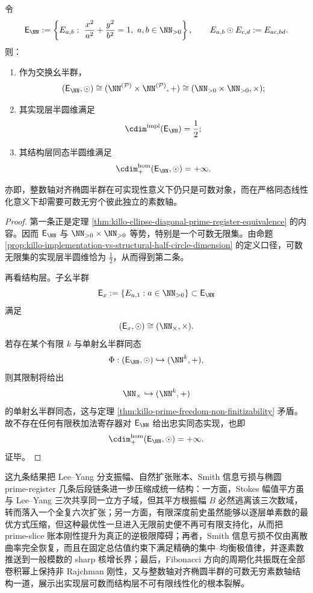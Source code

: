 \begin{theorem}[整数轴对齐椭圆半群在结构层与实现层的半圆维裂解]\label{thm:xi-time-part74-integer-ellipse-structure-implementation-split}
令
\[
\mathsf E_{\NN}
:=
\left\{
E_{a,b}:\ \frac{x^2}{a^2}+\frac{y^2}{b^2}=1,\ a,b\in\NN_{>0}
\right\},
\qquad
E_{a,b}\odot E_{c,d}:=E_{ac,bd}.
\]
则：
\begin{enumerate}
  \item 作为交换幺半群，
  \[
  (\mathsf E_{\NN},\odot)\cong (\NN^{(\mathcal P)}\times \NN^{(\mathcal P)},+)
  \cong (\NN_{>0}\times \NN_{>0},\times);
  \]
  \item 其实现层半圆维满足
  \[
  \cdim^{\mathrm{impl}}(\mathsf E_{\NN})=\frac12;
  \]
  \item 其结构层同态半圆维满足
  \[
  \cdim^{\mathrm{hom}}_{+}(\mathsf E_{\NN},\odot)=+\infty.
  \]
\end{enumerate}
亦即，整数轴对齐椭圆半群在可实现性意义下仍只是可数对象，而在严格同态线性化意义下却需要可数无穷个彼此独立的素数轴。
\end{theorem}
\begin{proof}
第一条正是定理 \ref{thm:killo-ellipse-diagonal-prime-register-equivalence} 的内容。因而 \(\mathsf E_{\NN}\) 与 \(\NN_{>0}\times \NN_{>0}\) 等势，特别是一个可数无限集。由命题 \ref{prop:killo-implementation-vs-structural-half-circle-dimension} 的定义口径，可数无限集的实现层半圆维恰为 \(\frac12\)，从而得到第二条。

再看结构层。子幺半群
\[
\mathsf E_x:=\{E_{a,1}:a\in\NN_{>0}\}\subset \mathsf E_{\NN}
\]
满足
\[
(\mathsf E_x,\odot)\cong (\NN_{\times},\times).
\]
若存在某个有限 \(k\) 与单射幺半群同态
\[
\Phi:(\mathsf E_{\NN},\odot)\hookrightarrow (\NN^k,+),
\]
则其限制将给出
\[
\NN_{\times}\hookrightarrow (\NN^k,+)
\]
的单射幺半群同态，这与定理 \ref{thm:killo-prime-freedom-non-finitizability} 矛盾。故不存在任何有限秩加法寄存器对 \(\mathsf E_{\NN}\) 给出忠实同态实现，也即
\[
\cdim^{\mathrm{hom}}_{+}(\mathsf E_{\NN},\odot)=+\infty.
\]
证毕。
\end{proof}

\noindent
这九条结果把 Lee--Yang 分支振幅、自然扩张账本、Smith 信息亏损与椭圆 prime-register 几条后段链条进一步压缩成统一结构：一方面，Stokes 幅值平方虽与 Lee--Yang 三次共享同一立方子域，但其平方根振幅 \(B\) 必然逃离该三次数域，转而落入一个全复六次扩张；另一方面，有限深度前史虽然能够以逐层单素数的最优方式压缩，但这种最优性一旦进入无限前史便不再可有限支持化，从而把 prime-slice 账本刚性提升为真正的逆极限障碍；再者，Smith 信息亏损不仅由离散曲率完全恢复，而且在固定总估值约束下满足精确的集中--均衡极值律，并逐素数推送到一般模数的 sharp 核增长界；最后，Fibonacci 方向的周期化共振既在全部卷积幂上保持非 Rajchman 刚性，又与整数轴对齐椭圆半群的可数无穷素数轴结构一道，展示出实现层可数而结构层不可有限线性化的根本裂解。



\endinput

